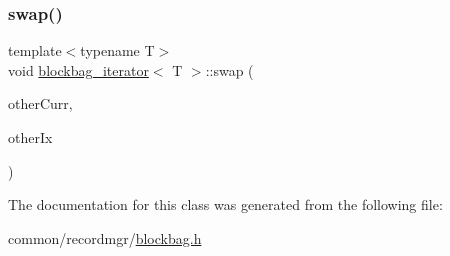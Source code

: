 \mbox{\label{classblockbag__iterator_a15dd4b935345d01a0bed723155010f74}} 
\subsubsection{\texorpdfstring{swap()}{swap()}}
{\footnotesize\ttfamily template$<$typename T$>$ \\
void \hyperlink{classblockbag__iterator}{blockbag\+\_\+iterator}$<$ T $>$\+::swap (\begin{DoxyParamCaption}\item[{\hyperlink{classblock}{block}$<$ T $>$ $\ast$const}]{other\+Curr,  }\item[{const int}]{other\+Ix }\end{DoxyParamCaption})\hspace{0.3cm}{\ttfamily [inline]}}



The documentation for this class was generated from the following file\+:\begin{DoxyCompactItemize}
\item 
common/recordmgr/\hyperlink{blockbag_8h}{blockbag.\+h}\end{DoxyCompactItemize}
